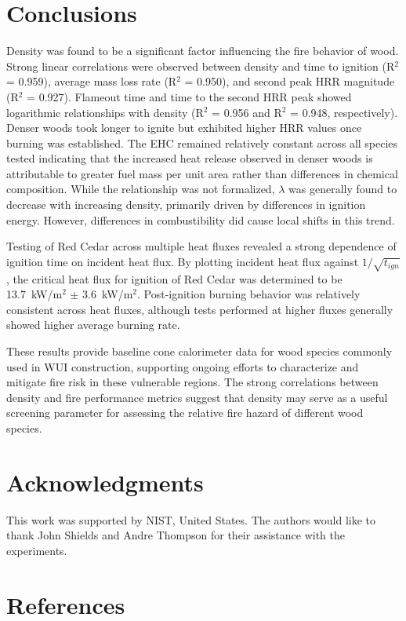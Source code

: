 \documentclass[12pt]{article}
\begin{document}
\section{Conclusions}
\label{sec:conclusions}
Density was found to be a significant factor influencing the fire behavior of wood. Strong linear correlations were observed between density and time to ignition (R$^2$ = 0.959), average mass loss rate (R$^2$ = 0.950), and second peak HRR magnitude (R$^2$ = 0.927). Flameout time and time to the second HRR peak showed logarithmic relationships with density (R$^2$ = 0.956 and R$^2$ = 0.948, respectively). Denser woods took longer to ignite but exhibited higher HRR values once burning was established. The EHC remained relatively constant across all species tested indicating that the increased heat release observed in denser woods is attributable to greater fuel mass per unit area rather than differences in chemical composition. While the relationship was not formalized, $\lambda$ was generally found to decrease with increasing density, primarily driven by differences in ignition energy. However, differences in combustibility did cause local shifts in this trend.

Testing of Red Cedar across multiple heat fluxes revealed a strong dependence of ignition time on incident heat flux. By plotting incident heat flux against $1/\sqrt{t_{ign}}$, the critical heat flux for ignition of Red Cedar was determined to be 13.7~kW/m$^2$ $\pm$ 3.6~kW/m$^2$. Post-ignition burning behavior was relatively consistent across heat fluxes, although tests performed at higher fluxes generally showed higher average burning rate.

These results provide baseline cone calorimeter data for wood species commonly used in WUI construction, supporting ongoing efforts to characterize and mitigate fire risk in these vulnerable regions. The strong correlations between density and fire performance metrics suggest that density may serve as a useful screening parameter for assessing the relative fire hazard of different wood species.

\section*{Acknowledgments}
\noindent This work was supported by NIST, United States. The authors would like to thank John Shields and Andre Thompson for their assistance with the experiments.

\section*{References}
\printbibliography[heading=none]
\end{document}
